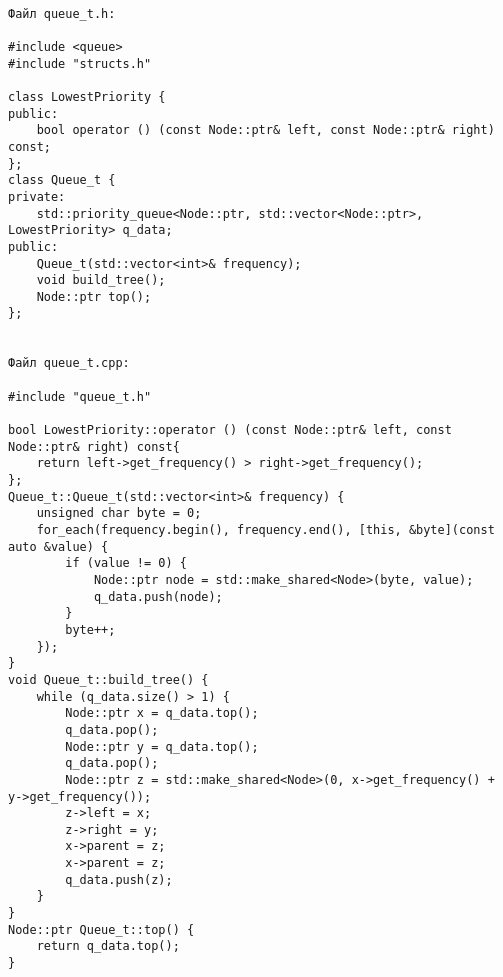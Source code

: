 \begin{verbatim}

Файл queue_t.h:

#include <queue>
#include "structs.h"

class LowestPriority {
public:
    bool operator () (const Node::ptr& left, const Node::ptr& right) const;
};
class Queue_t {
private:
    std::priority_queue<Node::ptr, std::vector<Node::ptr>, LowestPriority> q_data;
public:
    Queue_t(std::vector<int>& frequency);
    void build_tree();
    Node::ptr top();
};


Файл queue_t.cpp:

#include "queue_t.h"

bool LowestPriority::operator () (const Node::ptr& left, const Node::ptr& right) const{
    return left->get_frequency() > right->get_frequency();
};
Queue_t::Queue_t(std::vector<int>& frequency) {
    unsigned char byte = 0;
    for_each(frequency.begin(), frequency.end(), [this, &byte](const auto &value) {
        if (value != 0) {
            Node::ptr node = std::make_shared<Node>(byte, value);
            q_data.push(node);
        }
        byte++;
    });
}
void Queue_t::build_tree() {
    while (q_data.size() > 1) {
        Node::ptr x = q_data.top();
        q_data.pop();
        Node::ptr y = q_data.top();
        q_data.pop();
        Node::ptr z = std::make_shared<Node>(0, x->get_frequency() + y->get_frequency());
        z->left = x;
        z->right = y;
        x->parent = z;
        x->parent = z;
        q_data.push(z);
    }
}
Node::ptr Queue_t::top() {
    return q_data.top();
}
\end{verbatim}

